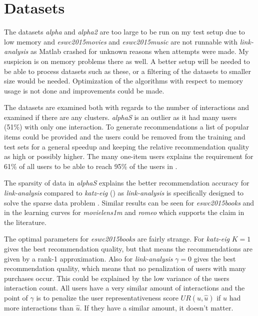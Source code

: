 \section{Datasets}

The datasets \textit{alpha} and \textit{alpha2} are too large to be run on my test setup due to low memory and \textit{eswc2015movies} and \textit{eswc2015music} are not runnable with \textit{link-analysis} as Matlab crashed for unknown reasons when attempts were made. My suspicion is on memory problems there as well. A better setup will be needed to be able to process datasets such as these, or a filtering of the datasets to smaller size would be needed. Optimization of the algorithms with respect to memory usage is not done and improvements could be made.

The datasets are examined both with regards to the number of interactions and examined if there are any clusters. \textit{alphaS} is an outlier as it had many users (51\%) with only one interaction. To generate recommendations a list of popular items could be provided and the users could be removed from the training and test sets for a general speedup and keeping the relative recommendation quality as high or possibly higher. The many one-item users explains the requirement for 61\% of all users to be able to reach 95\% of the users in .

The sparsity of data in \textit{alphaS} explains the better recommendation accuracy for \textit{link-analysis} compared to \textit{katz-eig} () as \textit{link-analysis} is specifically designed to solve the sparse data problem \citep{huang2004link, huang2007comparison}. Similar results can be seen for \textit{eswc2015books} and in the learning curves for \textit{movielens1m} and \textit{romeo} which supports the claim in the literature.

The optimal parameters for \textit{eswc2015books} are fairly strange. For \textit{katz-eig} $K = 1$ gives the best recommendation quality, but that means the recommendations are given by a rank-1 approximation. Also for \textit{link-analysis} $\gamma = 0$ gives the best recommendation quality, which means that no penalization of users with many purchases occur. This could be explained by the low variance of the users interaction count. All users have a very similar amount of interactions and the point of $\gamma$ is to penalize the user representativeness score $UR(u, \hat{u})$ if $u$ had more interactions than $\hat{u}$. If they have a similar amount, it doesn't matter.

